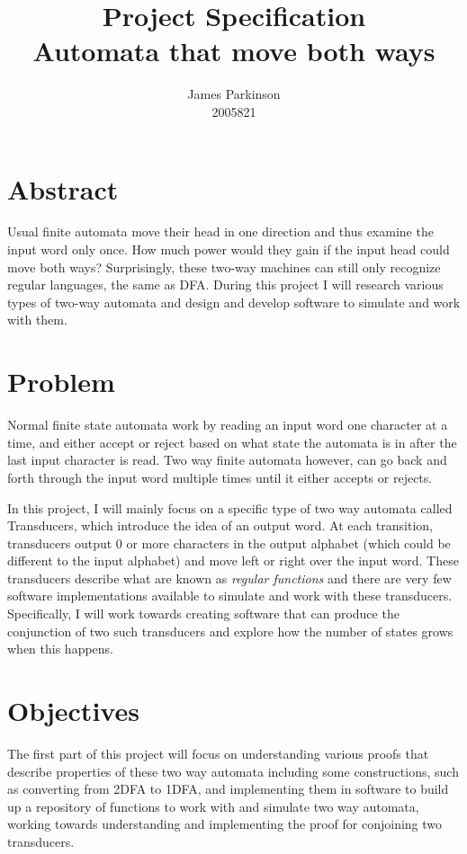 \documentclass[12pt, a4paper]{article}
\title{Project Specification\\Automata that move both ways}
\author{James Parkinson\\2005821}
\begin{document}
\maketitle

\section{Abstract}

Usual finite automata move their head in one direction and thus examine the input word only once. How much power would they gain if the input head could move both ways? Surprisingly, these two-way machines can still only recognize regular languages, the same as DFA. During this project I will research various types of two-way automata and design and develop software to simulate and work with them.

\section{Problem}

Normal finite state automata work by reading an input word one character at a time, and either accept or reject based on what state the automata is in after the last input character is read. Two way finite automata however, can go back and forth through the input word multiple times until it either accepts or rejects. 

In this project, I will mainly focus on a specific type of two way automata called Transducers, which introduce the idea of an output word. At each transition, transducers output 0 or more characters in the output alphabet (which could be different to the input alphabet) and move left or right over the input word. These transducers describe what are known as \textit{regular functions} and there are very few software implementations available to simulate and work with these transducers. Specifically, I will work towards creating software that can produce the conjunction of two such transducers and explore how the number of states grows when this happens.

\section{Objectives}

The first part of this project will focus on understanding various proofs that describe properties of these two way automata including some constructions, such as converting from 2DFA to 1DFA, and implementing them in software to build up a repository of functions to work with and simulate two way automata, working towards understanding and implementing the proof for conjoining two transducers.
\end{document}
